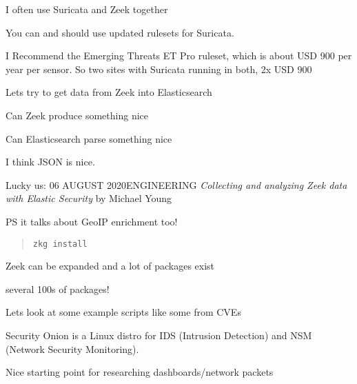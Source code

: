 \documentclass[Screen16to9,17pt]{foils}
\begin{document}

\centerline{I often use Suricata and Zeek together}



You can and should use updated rulesets for Suricata.

I Recommend the Emerging Threats ET Pro ruleset, which is about USD 900 per year per sensor. So two sites with Suricata running in both, 2x USD 900





\begin{list2}
\item Lets try to get data from Zeek into Elasticsearch
\item Can Zeek produce something nice
\item Can Elasticsearch parse something nice
\item I think JSON is nice.
\item Lucky us:
06 AUGUST 2020ENGINEERING
\emph{Collecting and analyzing Zeek data with Elastic Security}
by Michael Young\\
\item PS it talks about GeoIP enrichment too!
\end{list2}





\begin{quote}
\verb+zkg install +
\end{quote}

\begin{list2}
\item Zeek can be expanded and a lot of packages exist
\item {} several 100s of packages!
\item Lets look at some example scripts like some from CVEs
\end{list2}



Security Onion is a Linux distro for IDS (Intrusion Detection) and NSM (Network Security Monitoring).\\

\centerline{Nice starting point for researching dashboards/network packets}




\slidenext{}
\end{document}

